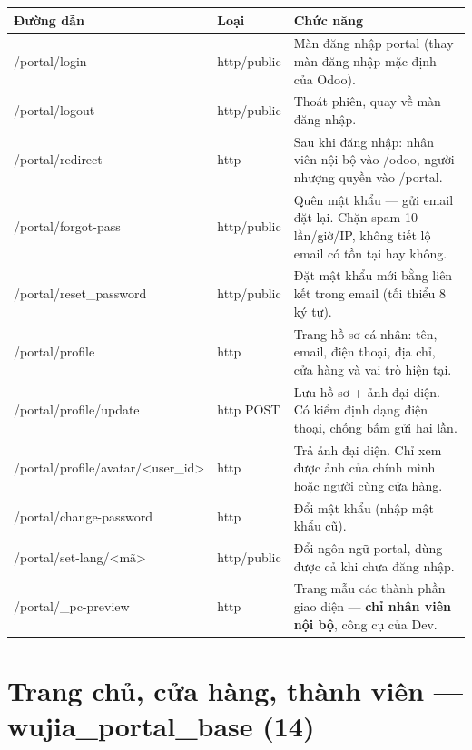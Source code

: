 \documentclass[11pt,a4paper]{report}
\newcommand{\rt}[1]{{\ttfamily\footnotesize #1}}
\begin{document}
{\small
\begin{longtable}{@{}L{5.4cm}L{1.5cm}L{7.5cm}@{}}
\toprule
\textbf{Đường dẫn} & \textbf{Loại} & \textbf{Chức năng} \\
\midrule
\endhead
\rt{/portal/login} & http/public & Màn đăng nhập portal (thay màn đăng nhập mặc định của Odoo). \\
\rt{/portal/logout} & http/public & Thoát phiên, quay về màn đăng nhập. \\
\rt{/portal/redirect} & http & Sau khi đăng nhập: nhân viên nội bộ vào \rt{/odoo}, người nhượng quyền vào \rt{/portal}. \\
\rt{/portal/forgot-pass} & http/public & Quên mật khẩu — gửi email đặt lại. Chặn spam 10 lần/giờ/IP, không tiết lộ email có tồn tại hay không. \\
\rt{/portal/reset\_password} & http/public & Đặt mật khẩu mới bằng liên kết trong email (tối thiểu 8 ký tự). \\
\rt{/portal/profile} & http & Trang hồ sơ cá nhân: tên, email, điện thoại, địa chỉ, cửa hàng và vai trò hiện tại. \\
\rt{/portal/profile/update} & http POST & Lưu hồ sơ + ảnh đại diện. Có kiểm định dạng điện thoại, chống bấm gửi hai lần. \\
\rt{/portal/profile/avatar/<user\_id>} & http & Trả ảnh đại diện. Chỉ xem được ảnh của chính mình hoặc người cùng cửa hàng. \\
\rt{/portal/change-password} & http & Đổi mật khẩu (nhập mật khẩu cũ). \\
\rt{/portal/set-lang/<mã>} & http/public & Đổi ngôn ngữ portal, dùng được cả khi chưa đăng nhập. \\
\rt{/portal/\_pc-preview} & http & Trang mẫu các thành phần giao diện — \textbf{chỉ nhân viên nội bộ}, công cụ của Dev. \\
\bottomrule
\end{longtable}}

\section{Trang chủ, cửa hàng, thành viên --- \rt{wujia\_portal\_base} (14)}
\end{document}
